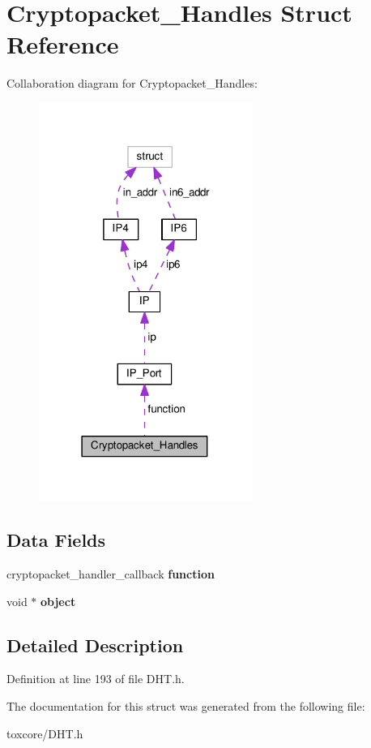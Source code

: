 \hypertarget{struct_cryptopacket___handles}{\section{Cryptopacket\+\_\+\+Handles Struct Reference}
\label{struct_cryptopacket___handles}
}


Collaboration diagram for Cryptopacket\+\_\+\+Handles\+:
\nopagebreak
\begin{figure}[H]
\begin{center}
\leavevmode
\includegraphics[width=198pt]{struct_cryptopacket___handles__coll__graph}
\end{center}
\end{figure}
\subsection*{Data Fields}
\begin{DoxyCompactItemize}
\item 
\hypertarget{struct_cryptopacket___handles_a9313784040f9666743d9aff915543903}{cryptopacket\+\_\+handler\+\_\+callback {\bfseries function}}\label{struct_cryptopacket___handles_a9313784040f9666743d9aff915543903}

\item 
\hypertarget{struct_cryptopacket___handles_a077376d12464f945e2414d5499c79b3f}{void $\ast$ {\bfseries object}}\label{struct_cryptopacket___handles_a077376d12464f945e2414d5499c79b3f}

\end{DoxyCompactItemize}


\subsection{Detailed Description}


Definition at line 193 of file D\+H\+T.\+h.



The documentation for this struct was generated from the following file\+:\begin{DoxyCompactItemize}
\item 
toxcore/D\+H\+T.\+h\end{DoxyCompactItemize}
